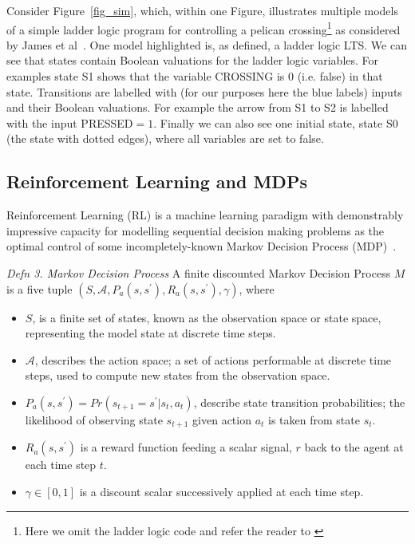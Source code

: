 \documentclass[conference,compsoc]{IEEEtran}
\begin{document}
Consider Figure~\ref{fig_sim}, which, within one Figure, illustrates multiple models of a simple ladder logic program for controlling a pelican crossing\footnote{Here we omit the ladder logic code and refer the reader to \cite{}} as considered by James et al~\cite{}. One model highlighted is, as defined, a ladder logic LTS. We can see that states contain Boolean valuations for the ladder logic variables. For examples state S1 shows that the variable CROSSING is $0$ (i.e. false) in that state. Transitions are labelled with (for our purposes here the blue labels) inputs and their Boolean valuations. For example the arrow from S1 to S2 is labelled with the input PRESSED$=1$. Finally we can also see one initial state, state S0 (the state with dotted edges), where all variables are set to false.

\subsection{Reinforcement Learning and MDPs}
Reinforcement Learning (RL) is a machine learning paradigm with demonstrably impressive capacity for modelling sequential decision making problems as the optimal control of some incompletely-known Markov Decision Process (MDP)~\cite{sutton2018reinforcement}.

\textit{Defn 3. Markov Decision Process} A finite discounted Markov Decision Process $M$ is a five tuple $(S,\mathcal{A},P_a(s,s^\prime), R_a(s,s^\prime),\gamma)$, where 
\begin{itemize}
	\item $S$, is a finite set of states, known as the observation space or state space, representing the model state at discrete time steps.
	\item $\mathcal{A}$, describes the action space; a set of actions performable at discrete time steps, used to compute new states from the observation space.
	\item $P_a(s,s^\prime) = Pr(s_{t+1} = s^\prime | s_t, a_t)$, describe state transition probabilities; the likelihood of observing state $s_{t+1}$ given action $a_t$ is taken from state $s_t$.
	\item $R_a(s,s^\prime)$ is a reward function feeding a scalar signal, $r$ back to the agent at each time step $t$. 
	\item $\gamma \in [0,1]$ is a discount scalar successively applied at each time step.
\end{itemize}

\end{document}
